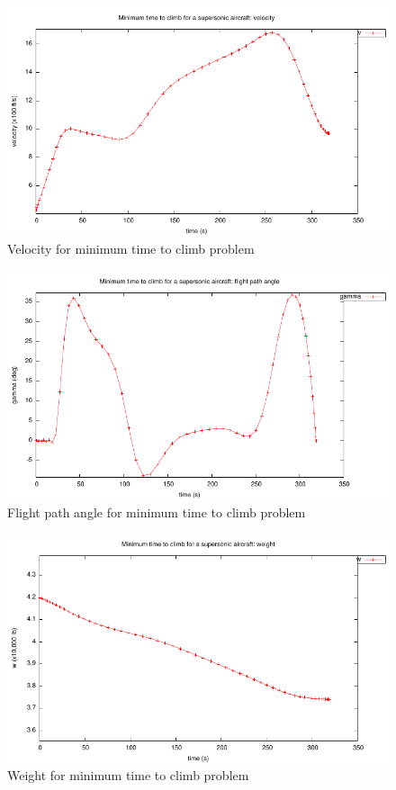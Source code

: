 \documentclass[a4paper,11pt]{report}    %
\begin{document}
\begin{figure}
  \centering
  \includegraphics{../examples/climb/climb_velocity}
  \caption{Velocity for minimum time to climb problem}
  \label{climb_speed}
\end{figure}

\begin{figure}
  \centering
  \includegraphics{../examples/climb/climb_fpa}
  \caption{Flight path angle for minimum time to climb problem}
  \label{climb_fpa}
\end{figure}

\begin{figure}
  \centering
  \includegraphics{../examples/climb/weight.pdf}
  \caption{Weight for minimum time to climb problem}
  \label{climb_weight}
\end{figure}
\end{document}
